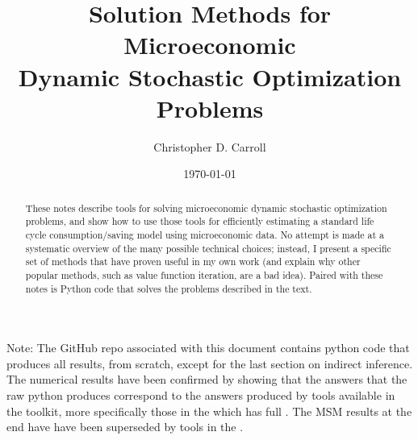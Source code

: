 \documentclass[titlepage, headings=optiontotocandhead]{econtex}
\begin{document}


\title{\Large Solution Methods for Microeconomic \\ \Large Dynamic Stochastic Optimization Problems}

\author{\large Christopher D. Carroll\authNum}


\large
\date{\today}
\maketitle
\footnotesize

\noindent  Note: The GitHub repo {\SMDSOPrepo} associated with this document contains python code that produces all results, from scratch, except for the last section on indirect inference.  The numerical results have been confirmed by showing that the answers that the raw python produces correspond to the answers produced by tools available in the {\ARKurl} toolkit, more specifically those in the {\HARKrepo} which has full {\HARKdocs}.  The MSM results at the end have have been superseded by tools in the {\EMDSOPrepo}.

\normalsize

\hypertarget{abstract}{}
\begin{abstract}
  These notes describe tools for solving microeconomic dynamic stochastic optimization problems, and show how to use those tools for efficiently estimating a standard life cycle consumption/saving model using microeconomic data.  No attempt is made at a systematic overview of the many possible technical choices; instead, I present a specific set of methods that have proven useful in my own work (and explain why other popular methods, such as value function iteration, are a bad idea).  Paired with these notes is Python code that solves the problems described in the text.
\end{abstract}
\end{document}
